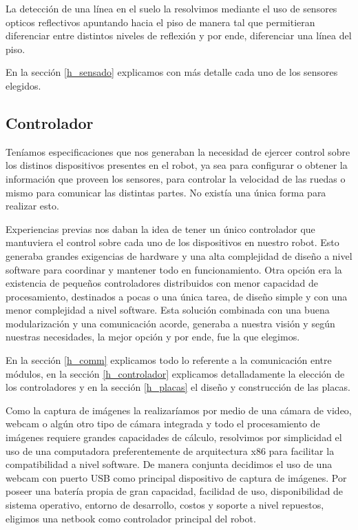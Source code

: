 La detecci\'on de una l\'inea en el suelo la resolvimos mediante el uso de sensores opticos reflectivos
apuntando hacia el piso de manera tal que permitieran diferenciar entre distintos niveles de reflexi\'on
y por ende, diferenciar una l\'inea del piso.

En la secci\'on \ref{h_sensado} explicamos con m\'as detalle cada uno de los sensores elegidos.

\subsection{Controlador}
\label{h_ideas_controlador}

Ten\'iamos especificaciones que nos generaban la necesidad de ejercer control sobre los distinos dispositivos
presentes en el robot, ya sea para configurar o obtener la informaci\'on que proveen los sensores, para
controlar la velocidad de las ruedas o mismo para comunicar las distintas partes.
No exist\'ia una \'unica forma para realizar esto.

Experiencias previas nos daban la idea de tener un \'unico controlador que mantuviera el control sobre cada uno
de los dispositivos en nuestro robot.
Esto generaba grandes exigencias de hardware y una alta complejidad de dise\~no a nivel software para coordinar
y mantener todo en funcionamiento.
Otra opci\'on era la existencia de peque\~nos controladores distribuidos con menor capacidad de procesamiento,
destinados a pocas o una \'unica tarea, de dise\~no simple y con una menor complejidad a nivel software.
Esta soluci\'on combinada con una buena modularizaci\'on y una comunicaci\'on acorde, generaba a nuestra visi\'on
y seg\'un nuestras necesidades, la mejor opci\'on y por ende, fue la que elegimos.

En la secci\'on \ref{h_comm} explicamos todo lo referente a la comunicaci\'on entre m\'odulos, en la secci\'on
\ref{h_controlador} explicamos detalladamente la elecci\'on de los controladores y en la secci\'on \ref{h_placas}
el dise\~no y construcci\'on de las placas.

Como la captura de im\'agenes la realizar\'iamos por medio de una c\'amara de video, webcam o alg\'un otro tipo
de c\'amara integrada y todo el procesamiento de im\'agenes requiere grandes capacidades de c\'alculo, resolvimos
por simplicidad el uso de una computadora preferentemente de arquitectura x86 para facilitar la compatibilidad
a nivel software.
De manera conjunta decidimos el uso de una webcam con puerto USB como principal dispositivo de captura de im\'agenes.
Por poseer una bater\'ia propia de gran capacidad, facilidad de uso, disponibilidad de sistema operativo, entorno
de desarrollo, costos y soporte a nivel repuestos, eligimos una netbook como controlador principal del robot.

